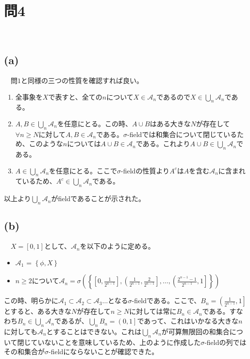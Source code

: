 \documentclass{article}
\begin{document}
\section{問4}
　\subsection{(a)}
　問$1$と同様の三つの性質を確認すれば良い。
\begin{enumerate}
	\item 全事象を$X$で表すと、全ての$n$について$X \in \mathcal{A}_n$であるので$X \in \bigcup_n \mathcal{A}_n$である。
	\item $A, B \in \bigcup_n \mathcal{A}_n$を任意にとる。この時、$A\cup B$はある大きな$N$が存在して$\forall n \geq N$に対して$A, B \in \mathcal{A}_n$である。$\sigma$-fieldでは和集合について閉じているため、このような$n$については$A\cup B \in \mathcal{A}_n$である。これより$A\cup B \in \bigcup_n \mathcal{A}_n$である。
	\item $A \in \bigcup_n \mathcal{A}_n$を任意にとる。ここで$\sigma$-fieldの性質より$A^c$は$A$を含む$\mathcal{A}_n$に含まれているため、$A^c \in \bigcup_n \mathcal{A}_n$である。
\end{enumerate}
以上より$\bigcup_n \mathcal{A}_n$がfieldであることが示された。

\subsection{(b)}
　$X = [0,1]$として、$\mathcal{A}_n$を以下のように定める。
\begin{itemize}
	\item $\mathcal{A}_1$ = $\left\{ \phi, X \right\}$
	\item $n \geq2$について$\mathcal{A}_n = \sigma\left(\left\{ \left[0, \frac{1}{2^{n-1}}\right], \left(\frac{1}{2^{n-1}}, \frac{2}{2^{n-1}}\right], \dots, \left(\frac{2^{n-1}-1}{2^{n-1}}, 1\right] \right\}\right)$
\end{itemize}
この時、明らかに$\mathcal{A}_1 \subset \mathcal{A}_2 \subset \mathcal{A}_3 \dots$となる$\sigma$-fieldである。ここで、$B_n = \left( \frac{1}{2^{n-1}}, 1\right]$とすると、ある大きな$N$が存在して$n \geq N$に対しては常に$B_n \in \mathcal{A}_n$である。すなわち$B_n \in \bigcup_n \mathcal{A}_n$であるが、$\bigcup_n B_n = \left(0, 1\right]$であって、これはいかなる大きな$n$に対しても$\mathcal{A}_n$とすることはできない。これは$\bigcup_n \mathcal{A}_n$が可算無限回の和集合について閉じていないことを意味しているため、上のように作成した$\sigma$-fieldの列ではその和集合が$\sigma$-fieldにならないことが確認できた。 
\end{document}
